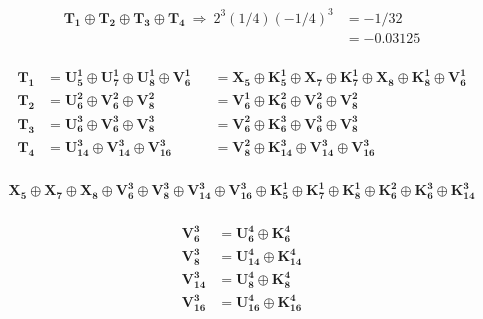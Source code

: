 \begin{equation*}
\begin{aligned}
    \mathbf{T_1} \oplus{} \mathbf{T_2} \oplus{} \mathbf{T_3} \oplus{} \mathbf{T_4} \ 
    \Rightarrow \ 2^3(1/4)(-1/4)^3 &= -1/32 \\
    &= -0.03125 \\
\end{aligned}
\end{equation*}

\begin{equation*}
\begin{aligned}
    \mathbf{T_1} &= \mathbf{U^1_5} \oplus{} \mathbf{U^1_7} \oplus{} \mathbf{U^1_8} \oplus{} \mathbf{V^1_6}  &
    &= \mathbf{X_5}\oplus{}\mathbf{K^1_5}\oplus{}\mathbf{X_7}\oplus{}\mathbf{K^1_7}\oplus{}\mathbf{X_8}\oplus{}\mathbf{K^1_8}\oplus{}\mathbf{V^1_6} \\
    \mathbf{T_2} &= \mathbf{U^2_6} \oplus{} \mathbf{V^2_6} \oplus{} \mathbf{V^2_8}                          & 
    &= \mathbf{V^1_6} \oplus{} \mathbf{K^2_6} \oplus{} \mathbf{V^2_6} \oplus{} \mathbf{V^2_8}\\
    \mathbf{T_3} &= \mathbf{U^3_6} \oplus{} \mathbf{V^3_6} \oplus{} \mathbf{V^3_8}                          & 
    &= \mathbf{V^2_6} \oplus{} \mathbf{K^3_6} \oplus{} \mathbf{V^3_6} \oplus{} \mathbf{V^3_8}\\
    \mathbf{T_4} &= \mathbf{U^3_{14}} \oplus{} \mathbf{V^3_{14}} \oplus{} \mathbf{V^3_{16}}                 & 
    &= \mathbf{V^2_8} \oplus{} \mathbf{K^3_{14}} \oplus{} \mathbf{V^3_{14}} \oplus{} \mathbf{V^3_{16}}\\
\end{aligned}
\end{equation*}

\begin{equation*}
\begin{aligned}
    \mathbf{X_5} \oplus{} \mathbf{X_7} \oplus{} \mathbf{X_8} \oplus{} \mathbf{V^3_6} \oplus{} \mathbf{V^3_8} \oplus{} \mathbf{V^3_{14}} \oplus{} \mathbf{V^3_{16}} \oplus{} \mathbf{K^1_5} \oplus{} \mathbf{K^1_7} \oplus{} \mathbf{K^1_8} \oplus{} \mathbf{K^2_6} \oplus{} \mathbf{K^3_6} \oplus{} \mathbf{K^3_{14}} \\
\end{aligned}
\end{equation*}

\begin{equation*}
\begin{aligned}
    \mathbf{V^3_6} &= \mathbf{U^4_6} \oplus{} \mathbf{K^4_6} \\
    \mathbf{V^3_8} &= \mathbf{U^4_{14}} \oplus{} \mathbf{K^4_{14}} \\
    \mathbf{V^3_{14}} &= \mathbf{U^4_8} \oplus{} \mathbf{K^4_8} \\
    \mathbf{V^3_{16}} &= \mathbf{U^4_{16}} \oplus{} \mathbf{K^4_{16}} \\
\end{aligned}
\end{equation*}

